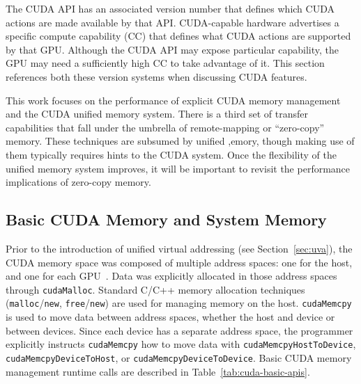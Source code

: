 The CUDA API has an associated version number that defines which CUDA actions are made available by that API.
CUDA-capable hardware advertises a specific compute capability (CC) that defines what CUDA actions are supported by that GPU.
Although the CUDA API may expose particular capability, the GPU may need a sufficiently high CC to take advantage of it.
This section references both these version systems when discussing CUDA features.

This work focuses on the performance of explicit CUDA memory management and the CUDA unified memory system.
There is a third set of transfer capabilities that fall under the umbrella of remote-mapping or ``zero-copy'' memory.
These techniques are subsumed by unified ,emory, though making use of them typically requires hints to the CUDA system.
Once the flexibility of the unified memory system improves, it will be important to revisit the performance implications of zero-copy memory.

\subsection{Basic CUDA Memory and System Memory}
\label{sec:basic-cuda}

Prior to the introduction of unified virtual addressing (see Section~\ref{sec:uva}), the CUDA memory space was composed of multiple address spaces: one for the host, and one for each GPU~\cite{schroeder2011peer}.
Data was explicitly allocated in those address spaces through \texttt{cudaMalloc}.
Standard C/C++ memory allocation techniques (\texttt{malloc}/\texttt{new}, \texttt{free}/\texttt{new}) are used for managing memory on the host.
\texttt{cudaMemcpy} is used to move data between address spaces, whether the host and device or between devices.
Since each device has a separate address space, the programmer explicitly instructs \texttt{cudaMemcpy} how to move data with \texttt{cudaMemcpyHostToDevice}, \texttt{cudaMemcpyDeviceToHost}, or \texttt{cudaMemcpyDeviceToDevice}.
Basic CUDA memory management runtime calls are described in Table~\ref{tab:cuda-basic-apis}.

